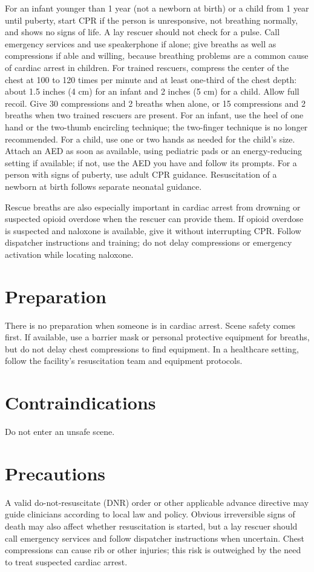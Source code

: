 For an infant younger than 1 year (not a newborn at birth) or a child from 1 year until puberty, start CPR if the person is unresponsive, not breathing normally, and shows no signs of life. A lay rescuer should not check for a pulse. Call emergency services and use speakerphone if alone; give breaths as well as compressions if able and willing, because breathing problems are a common cause of cardiac arrest in children. For trained rescuers, compress the center of the chest at 100 to 120 times per minute and at least one-third of the chest depth: about 1.5 inches (4 cm) for an infant and 2 inches (5 cm) for a child. Allow full recoil. Give 30 compressions and 2 breaths when alone, or 15 compressions and 2 breaths when two trained rescuers are present. For an infant, use the heel of one hand or the two-thumb encircling technique; the two-finger technique is no longer recommended. For a child, use one or two hands as needed for the child's size. Attach an AED as soon as available, using pediatric pads or an energy-reducing setting if available; if not, use the AED you have and follow its prompts. For a person with signs of puberty, use adult CPR guidance. Resuscitation of a newborn at birth follows separate neonatal guidance.

Rescue breaths are also especially important in cardiac arrest from drowning or suspected opioid overdose when the rescuer can provide them. If opioid overdose is suspected and naloxone is available, give it without interrupting CPR. Follow dispatcher instructions and training; do not delay compressions or emergency activation while locating naloxone.

\section*{Preparation}
There is no preparation when someone is in cardiac arrest. Scene safety comes first. If available, use a barrier mask or personal protective equipment for breaths, but do not delay chest compressions to find equipment. In a healthcare setting, follow the facility's resuscitation team and equipment protocols.

\section*{Contraindications}
Do not enter an unsafe scene.

\section*{Precautions}
A valid do-not-resuscitate (DNR) order or other applicable advance directive may guide clinicians according to local law and policy. Obvious irreversible signs of death may also affect whether resuscitation is started, but a lay rescuer should call emergency services and follow dispatcher instructions when uncertain. Chest compressions can cause rib or other injuries; this risk is outweighed by the need to treat suspected cardiac arrest.

